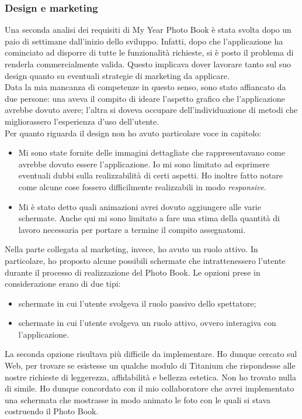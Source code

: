 			\subsubsection{Design e marketing}
				Una seconda analisi dei requisiti di My Year Photo Book è stata svolta dopo un paio di settimane dall'inizio dello
				sviluppo. Infatti, dopo che l'applicazione ha cominciato ad disporre di tutte le funzionalità richieste, si è posto il
				problema di renderla commercialmente valida. Questo implicava dover lavorare tanto sul suo design quanto su eventuali
				strategie di marketing da applicare.\\
				Data la mia mancanza di competenze in questo senso, sono stato affiancato da due persone: una aveva il compito di
				ideare l'aspetto grafico che l'applicazione avrebbe dovuto avere; l'altra si doveva occupare dell'individuazione di
				metodi che migliorassero l'esperienza d'uso dell'utente.\\
				Per quanto riguarda il design non ho avuto particolare voce in capitolo:
				\begin{itemize}
					\item Mi sono state fornite delle immagini dettagliate che rappresentavano come avrebbe dovuto essere
					l'applicazione. Io mi sono limitato ad esprimere eventuali dubbi sulla realizzabilità di certi aspetti. Ho
					inoltre fatto notare come alcune cose fossero difficilmente realizzabili in modo \emph{responsive}.
					\item Mi è stato detto quali animazioni avrei dovuto aggiungere alle varie schermate. Anche qui mi sono
					limitato a fare una stima della quantità di lavoro necessaria per portare a termine il compito assegnatomi.
				\end{itemize}
				Nella parte collegata al marketing, invece, ho avuto un ruolo attivo. In particolare, ho proposto alcune possibili
				schermate che intrattenessero l'utente durante il processo di realizzazione del Photo Book. Le opzioni prese in
				considerazione erano di due tipi:
				\begin{itemize}
					\item schermate in cui l'utente svolgeva il ruolo passivo dello spettatore;
					\item schermate in cui l'utente svolgeva un ruolo attivo, ovvero interagiva con l'applicazione.
				\end{itemize}
				La seconda opzione risultava più difficile da implementare. Ho dunque cercato sul Web, per trovare se esistesse un
				qualche modulo di Titanium che rispondesse alle nostre richieste di leggerezza, affidabilità e bellezza estetica. Non
				ho trovato nulla di simile. Ho dunque concordato con il mio collaboratore che avrei implementato una schermata
				che mostrasse in modo animato le foto con le quali si stava costruendo il Photo Book.
